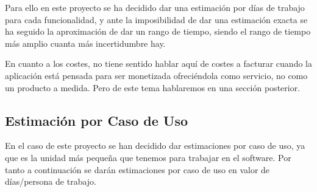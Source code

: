 \documentclass[12pt,a4paperpaper,]{report}
\begin{document}
Para ello en este proyecto se ha decidido dar una estimación por días de
trabajo para cada funcionalidad, y ante la imposibilidad de dar una
estimación exacta se ha seguido la aproximación de dar un rango de
tiempo, siendo el rango de tiempo más amplio cuanta más incertidumbre
hay.

En cuanto a los costes, no tiene sentido hablar aquí de costes a
facturar cuando la aplicación está pensada para ser monetizada
ofreciéndola como servicio, no como un producto a medida. Pero de este
tema hablaremos en una sección posterior.

\subsection{Estimación por Caso de
Uso}\label{estimaciuxf3n-por-caso-de-uso}

En el caso de este proyecto se han decidido dar estimaciones por caso de
uso, ya que es la unidad más pequeña que tenemos para trabajar en el
software. Por tanto a continuación se darán estimaciones por caso de uso
en valor de días/persona de trabajo.
\end{document}
